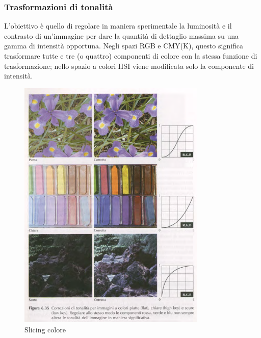 \documentclass[12pt]{article}
\begin{document}
\subsubsection{Trasformazioni di tonalità}
L'obiettivo è quello di regolare in maniera sperimentale la luminosità e il contrasto di un'immagine per dare la quantità di dettaglio massima su una gamma di intensità opportuna. Negli spazi RGB e CMY(K), questo significa trasformare tutte e tre (o quattro) componenti di colore con la stessa funzione
di trasformazione; nello spazio a colori HSI viene modificata solo la componente di intensità.
\begin{figure}[!htb]
    \centering
    \includegraphics[width=0.8\textwidth]{Images/tonal.png}
    \caption{Slicing colore}
\end{figure}
\FloatBarrier
\end{document}

